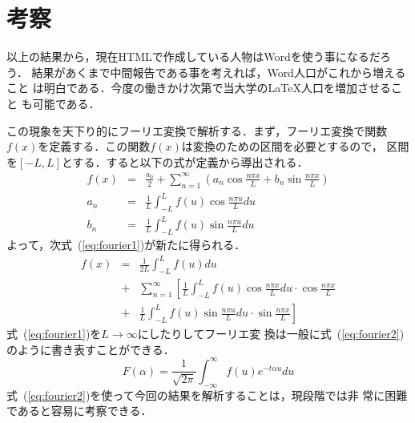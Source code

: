 ﻿\documentclass[twocolumn,papersize]{jsarticle}
\begin{document}
\section{考察}
以上の結果から，現在HTMLで作成している人物はWordを使う事になるだろう．
結果があくまで中間報告である事を考えれば，Word人口がこれから増えること
は明白である．今度の働きかけ次第で当大学の\LaTeX{}人口を増加させること
も可能である．

この現象を天下り的にフーリエ変換で解析する．まず，フーリエ変換で関数
$f(x)$を定義する．この関数$f(x)$は変換のための区間を必要とするので，
区間を$[-L,L]$とする．すると以下の式が定義から導出される．
\begin{eqnarray*}
f(x)& = & \frac{a_0}{2} + \sum^{\infty}_{n=1} \left( a_n \cos 
          \frac{n\pi x}{L} + b_n \sin \frac{n\pi x}{L} \right) \\
a_n & = & \frac{1}{L} \int^{L}_{-L} f(u) \cos \frac{n\pi u}{L} du\\
b_n & = & \frac{1}{L} \int^{L}_{-L} f(u) \sin \frac{n\pi u}{L} du
\end{eqnarray*}
よって，次式~(\ref{eq:fourier1})が新たに得られる．
\begin{eqnarray}
f(x) & = & \frac{1}{2L} \int^{L}_{-L} f(u) du \nonumber\\
     & + & \sum^{\infty}_{n=1} \left[ \frac{1}{L} \int^{L}_{-L}
           f(u) \cos \frac{n\pi x}{L} du \cdot \cos \frac{n\pi x}{L}
           \right. \nonumber \\
     & + & \left. \frac{1}{L} \int^{L}_{-L} f(u) \sin 
           \frac{n\pi u }{L}du \cdot \sin \frac{n\pi x}{L} \right]
           \label{eq:fourier1}
\end{eqnarray}
式~(\ref{eq:fourier1})を\(L\rightarrow\infty\)にしたりしてフーリエ変
換は一般に式~(\ref{eq:fourier2})のように書き表すことができる．
\begin{equation}
F(\alpha )= \frac{1}{\sqrt{2\pi}} \int^{\infty}_{-\infty} 
            f(u) e^{-t\alpha u}du \label{eq:fourier2}
\end{equation}
式~(\ref{eq:fourier2})を使って今回の結果を解析することは，現段階では非
常に困難であると容易に考察できる．
\end{document}
